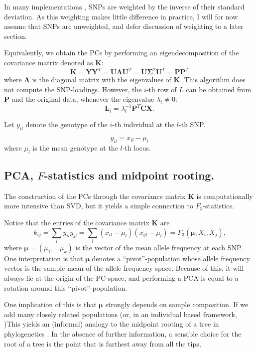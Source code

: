 \documentclass[10pt,a4paper]{article}
\newcommand{\MX}{\mathbf{X}} %
\newcommand{\MC}{\mathbf{C}} %
\newcommand{\MY}{\mathbf{Y}} %
\newcommand{\MP}{\mathbf{P}} %
\newcommand{\ML}{\mathbf{L}} %
\newcommand{\MK}{\mathbf{K}} %
\newcommand{\MSINGULAR}{\mathbf{\Sigma}} %
\newcommand{\MEIGEN}{\mathbf{\Lambda}} %
\newcommand{\MEAN}{\boldsymbol{\mu}} %
\begin{document}
	In many  implementations \citep[e.g]{patterson2006}, SNPs are weighted by the inverse of their standard deviation. As this weighting makes little difference in practice, I will for now assume that SNPs are unweighted, and defer discussion of weighting to a later section.
	
	Equivalently, we obtain the PCs by performing an eigendecomposition of the  covariance matrix denoted as $\MK$:
	 \begin{equation}
 \MK = \MY \MY^T = \mathbf{U}\MEIGEN\mathbf{U}^T = \mathbf{U}\MSINGULAR^2\mathbf{U}^T =\MP\MP^T
	\end{equation} where $\MEIGEN$ is the diagonal matrix with the eigenvalues of $\MK$. 
	This algorithm does not compute the SNP-loadings. However, the $i$-th row of $L$  can be obtained from $\MP$ and the original data, whenever the eigenvalue $\lambda_i \neq 0$:
	\begin{equation}
	\ML_i = \lambda_i^{-1}\MP^T\MC\MX \text{.}
	\end{equation}
	
	
	Let $y_{il}$ denote the genotype of the $i$-th individual at the $l$-th SNP.
	
	\begin{equation}
	y_{il} = x_{il} - \mu_l
	\end{equation}
	where $\mu_l$ is the mean genotype at the $l$-th locus.
	
	
	\subsection{PCA, $F$-statistics and midpoint rooting.}
    The construction of the PCs through the covariance matrix $\MK$ is computationally more intensive than SVD, but it yields a simple connection to $F_3$-statistics.

	Notice that the entries of the covariance matrix $\MK$ are
	\begin{equation}
	k_{ij} = \sum_l y_{il} y_{jl} = \sum_l (x_{il} - \mu_l)(x_{yl} - \mu_l) = F_3(\MEAN; X_i, X_j)\text{,}
	\end{equation}
	where $\MEAN = (\mu_1, \dots \mu_k)$ is the vector of the mean allele frequency at each SNP. One interpretation is that $\MEAN$ denotes a ``pivot''-population whose allele frequency vector is the sample mean of the allele frequency space. Because of this, it will always lie at the origin of the PC-space, and performing a PCA is equal to a rotation around this ``pivot''-population.
	
	One implication of this is that $\MEAN$ strongly depends on sample composition. If we add many closely related populations (or, in an individual based framework, )This yields an (informal) analogy to the midpoint rooting of a tree in phylogenetics \citep[see e.g.][]{felsenstein2004}. In the absence of further information, a sensible choice for the root of a tree is the point that is furthest away from all the tips, 
	
\end{document}
